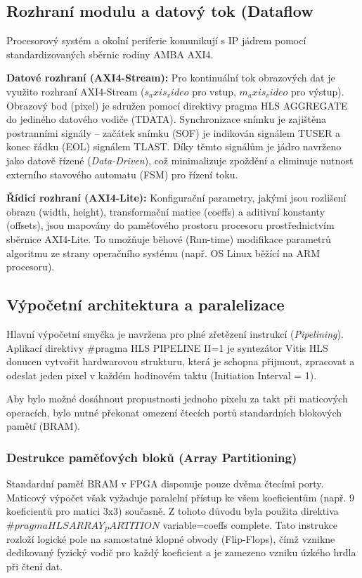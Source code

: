 \subsection{Rozhraní modulu a datový tok (Dataflow}
Procesorový systém a okolní periferie komunikují s IP jádrem pomocí standardizovaných sběrnic rodiny AMBA AXI4.


\textbf{Datové rozhraní (AXI4-Stream):} Pro kontinuální tok obrazových dat je využito rozhraní AXI4-Stream ($s_axis_video$ pro vstup, $m_axis_video$ pro výstup). Obrazový bod (pixel) je sdružen pomocí direktivy pragma HLS AGGREGATE do jediného datového vodiče (TDATA). Synchronizace snímku je zajištěna postranními signály – začátek snímku (SOF) je indikován signálem TUSER a konec řádku (EOL) signálem TLAST. Díky těmto signálům je jádro navrženo jako datově řízené (\textit{Data-Driven}), což minimalizuje zpoždění a eliminuje nutnost externího stavového automatu (FSM) pro řízení toku.

\textbf{Řídicí rozhraní (AXI4-Lite):} Konfigurační parametry, jakými jsou rozlišení obrazu (width, height), transformační matice (coeffs) a aditivní konstanty (offsets), jsou mapovány do paměťového prostoru procesoru prostřednictvím sběrnice AXI4-Lite. To umožňuje běhové (Run-time) modifikace parametrů algoritmu ze strany operačního systému (např. OS Linux běžící na ARM procesoru).

\subsection{Výpočetní architektura a paralelizace}

Hlavní výpočetní smyčka je navržena pro plné zřetězení instrukcí (\textit{Pipelining}). Aplikací direktivy \#pragma HLS PIPELINE II=1 je syntezátor Vitis HLS donucen vytvořit hardwarovou strukturu, která je schopna přijmout, zpracovat a odeslat jeden pixel v každém hodinovém taktu (Initiation Interval = 1). 

Aby bylo možné dosáhnout propustnosti jednoho pixelu za takt při maticových operacích, bylo nutné překonat omezení čtecích portů standardních blokových pamětí (BRAM). 

\subsubsection{Destrukce paměťových bloků (Array Partitioning)
}
Standardní paměť BRAM v FPGA disponuje pouze dvěma čtecími porty. Maticový výpočet však vyžaduje paralelní přístup ke všem koeficientům (např. 9 koeficientů pro matici 3x3) současně. Z tohoto důvodu byla použita direktiva $\#pragma HLS ARRAY_PARTITION$ variable=coeffs complete. Tato instrukce rozloží logické pole na samostatné klopné obvody (Flip-Flops), čímž vznikne dedikovaný fyzický vodič pro každý koeficient a je zamezeno vzniku úzkého hrdla při čtení dat.

